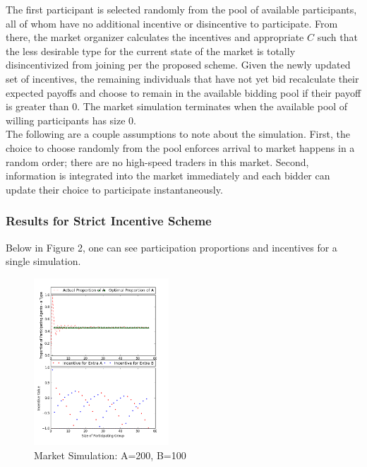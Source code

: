 \documentclass[twoside,twocolumn]{article}
\begin{document}
The first participant is selected randomly from the pool of available participants, all of whom have no additional incentive or disincentive to participate. From there, the market organizer calculates the incentives and appropriate $C$ such that the less desirable type for the current state of the market is totally disincentivized from joining per the proposed scheme. Given the newly updated set of incentives, the remaining individuals that have not yet bid recalculate their expected payoffs and choose to remain in the available bidding pool if their payoff is greater than 0. The market simulation terminates when the available pool of willing participants has size 0.\\

The following are a couple assumptions to note about the simulation. First, the choice to choose randomly from the pool enforces arrival to market happens in a random order; there are no high-speed traders in this market. Second, information is integrated into the market immediately and each bidder can update their choice to participate instantaneously.

\subsubsection{Results for Strict Incentive Scheme}

Below in Figure 2, one can see participation proportions and incentives for a single simulation.

\begin{figure}[h]
\centering
\includegraphics[width=0.45\textwidth]{figure_2.png}
\caption{Market Simulation: A=200, B=100}
\end{figure}
\end{document}
